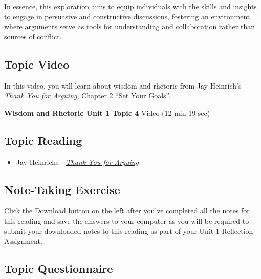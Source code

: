 \documentclass[
]{book}
\providecommand{\tightlist}{%
  \setlength{\itemsep}{0pt}\setlength{\parskip}{0pt}}
\begin{document}
In essence, this exploration aims to equip individuals with the skills and insights to engage in persuasive and constructive discussions, fostering an environment where arguments serve as tools for understanding and collaboration rather than sources of conflict.

\hypertarget{topic-video-3}{%
\subsection*{Topic Video}\label{topic-video-3}}

In this video, you will learn about wisdom and rhetoric from Jay Heinrich's \emph{Thank You for Arguing}, Chapter 2 ``Set Your Goals''.

\textbf{Wisdom and Rhetoric Unit 1 Topic 4} Video (12 min 19 sec)

\hypertarget{topic-reading-3}{%
\subsection*{Topic Reading}\label{topic-reading-3}}

\begin{itemize}
\tightlist
\item
  Jay Heinrichs - \href{assets/u1/PHIL-100-Heinrichs-Thank-You-for-Arguing.pdf}{\emph{Thank You for Arguing}}
\end{itemize}

\hypertarget{note-taking-exercise-3}{%
\subsection*{Note-Taking Exercise}\label{note-taking-exercise-3}}

\begin{reflect}
Click the Download button on the left after you've completed all the notes for this reading and save the answers to your computer as you will be required to submit your downloaded notes to this reading as part of your Unit 1 Reflection Assignment.
\end{reflect}

\hypertarget{topic-questionnaire-3}{%
\subsection*{Topic Questionnaire}\label{topic-questionnaire-3}}
\end{document}
